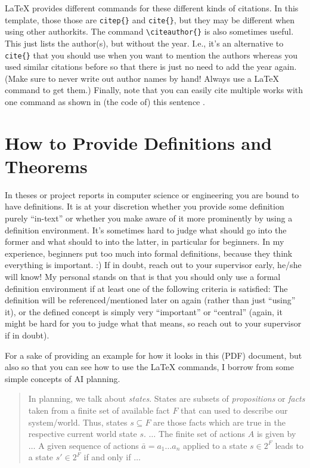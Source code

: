 \LaTeX{} provides different commands for these different kinds of citations. In this template, those those are \verb!citep{}! and \verb!cite{}!, but they may be different when using other authorkits. The command \verb!\citeauthor{}! is also sometimes useful. This just lists the author(s), but without the year. I.e., it's an alternative  to \verb!cite{}! that you should use when you want to mention the authors whereas you used similar citations before so that there is just no need to add the year again. (Make sure to never write out author names by hand! Always use a \LaTeX{} command to get them.) Finally, note that you can easily cite multiple works with one command as shown in (the code of) this sentence \citep{Cooper2015SuperfluidVacuumTheory,Smith2021Wubalubadubdub}.
  
    
  
\section{How to Provide Definitions and Theorems} 

In theses or project reports in computer science or engineering you are bound to have definitions. It is at your discretion whether you provide some definition purely ``in-text'' or whether you make aware of it more prominently by using a definition environment. It's sometimes hard to judge what should go into the former and what should to into the latter, in particular for beginners. In my experience, beginners put too much into formal definitions, because they think everything is important. :) If in doubt, reach out to your supervisor early, he/she will know! My personal stands on that is that you should only use a formal definition environment if at least one of the following criteria is satisfied: The definition will be referenced/mentioned later on again (rather than just ``using'' it), or the defined concept is simply very ``important'' or ``central'' (again, it might be hard for you to judge what that means, so reach out to your supervisor if in doubt).
  
For a sake of providing an example for how it looks in this (PDF) document, but also so that you can see how to use the \LaTeX{} commands, I borrow from some simple concepts of AI planning.
  
\begin{quote}In planning, we talk about \emph{states}. States are subsets of \emph{propositions} or \emph{facts} taken from a finite set of available fact $F$ that can used to describe our system/world. Thus, states $s\subseteq F$ are those facts which are true in the respective current world state $s$. $\dots$ The finite set of actions $A$ is given by $\dots$ A given sequence of actions $\bar{a}=a_1\dots a_n$ applied to a state $s\in 2^F$ leads to a state $s'\in 2^F$ if and only if $\dots$\end{quote}
  
